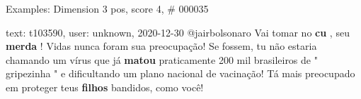 \begin{frame}{Examples: Dimension 3 pos, score 4, \# 000035}
\footnotesize
\begin{exampleblock}{text: t103590, user: unknown, 2020-12-30}
@jairbolsonaro Vai tomar no \textbf{cu} , seu \textbf{merda} ! Vidas nunca 
foram sua preocupação! Se fossem, tu não estaria chamando um vírus que já 
\textbf{matou} praticamente 200 mil brasileiros de " gripezinha " e 
dificultando um plano nacional de vacinação! Tá mais preocupado em proteger 
teus \textbf{filhos} bandidos, como você! 
\end{exampleblock}
\end{frame}
